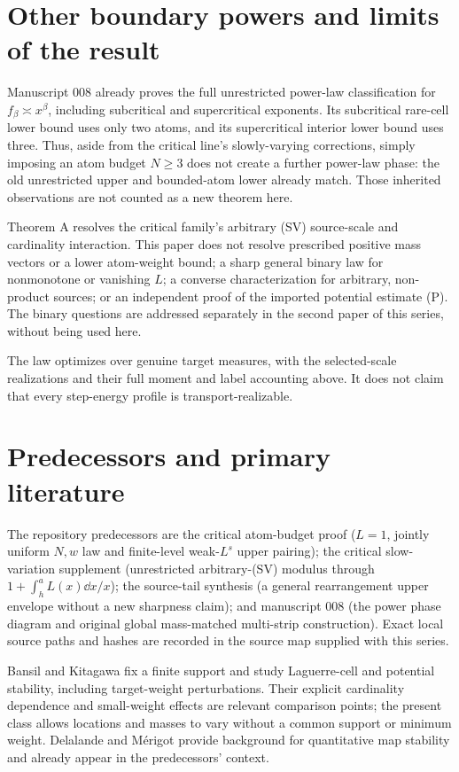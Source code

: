 \section{Other boundary powers and limits of the result}
Manuscript 008 already proves the full unrestricted power-law classification for $f_\beta\asymp x^\beta$, including subcritical and supercritical exponents. Its subcritical rare-cell lower bound uses only two atoms, and its supercritical interior lower bound uses three. Thus, aside from the critical line's slowly-varying corrections, simply imposing an atom budget $N\ge3$ does not create a further power-law phase: the old unrestricted upper and bounded-atom lower already match. Those inherited observations are not counted as a new theorem here.

Theorem A resolves the critical family's arbitrary (SV) source-scale and cardinality interaction. This paper does not resolve prescribed positive mass vectors or a lower atom-weight bound; a sharp general binary law for nonmonotone or vanishing $L$; a converse characterization for arbitrary, non-product sources; or an independent proof of the imported potential estimate (P). The binary questions are addressed separately in the second paper of this series, without being used here.

The law optimizes over genuine target measures, with the selected-scale realizations and their full moment and label accounting above. It does not claim that every step-energy profile is transport-realizable.

\section{Predecessors and primary literature}
The repository predecessors are the critical atom-budget proof ($L=1$, jointly uniform $N,w$ law and finite-level weak-$L^s$ upper pairing); the critical slow-variation supplement (unrestricted arbitrary-(SV) modulus through $1+\int_h^a L(x)\dd x/x$); the source-tail synthesis (a general rearrangement upper envelope without a new sharpness claim); and manuscript 008 (the power phase diagram and original global mass-matched multi-strip construction). Exact local source paths and hashes are recorded in the source map supplied with this series.

Bansil and Kitagawa \cite{bansil} fix a finite support and study Laguerre-cell and potential stability, including target-weight perturbations. Their explicit cardinality dependence and small-weight effects are relevant comparison points; the present class allows locations and masses to vary without a common support or minimum weight. Delalande and M\'erigot \cite{delalande} provide background for quantitative map stability and already appear in the predecessors' context.

